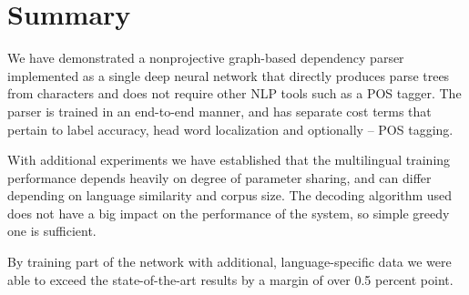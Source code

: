 \chapter{Summary}
We have demonstrated a nonprojective graph-based dependency parser implemented as a single deep
neural network that directly produces parse trees from characters and does not require
other NLP tools such as a POS tagger. The parser is trained in an end-to-end manner,
and has separate cost terms that pertain to label accuracy,
head word localization and optionally -- POS tagging.

With additional experiments we have established that the multilingual training
performance depends heavily on degree of parameter sharing, and can differ
depending on language similarity and corpus size. The decoding
algorithm used does not have a big impact on the performance of the system,
so simple greedy one is sufficient.

By training part of the network with additional, language-specific data we were
able to exceed the state-of-the-art results by a margin of over 0.5 percent point.
